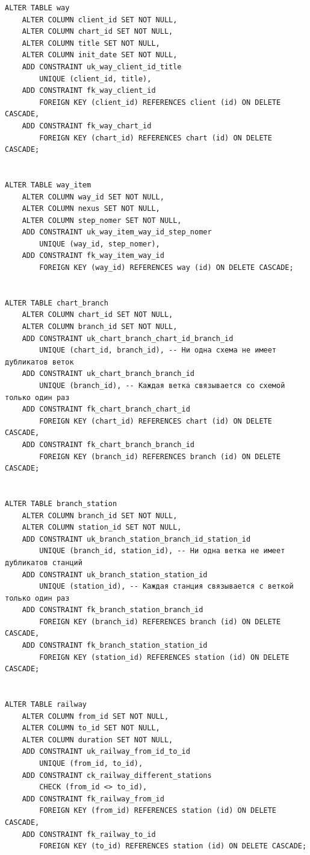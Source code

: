 \clearpage

\begin{lstlisting}[label=lst:cnst2,caption=Запросы для создания ограничений таблиц (часть 2)]
ALTER TABLE way
    ALTER COLUMN client_id SET NOT NULL,
    ALTER COLUMN chart_id SET NOT NULL,
    ALTER COLUMN title SET NOT NULL,
    ALTER COLUMN init_date SET NOT NULL,
    ADD CONSTRAINT uk_way_client_id_title
        UNIQUE (client_id, title),
    ADD CONSTRAINT fk_way_client_id
        FOREIGN KEY (client_id) REFERENCES client (id) ON DELETE CASCADE,
    ADD CONSTRAINT fk_way_chart_id
        FOREIGN KEY (chart_id) REFERENCES chart (id) ON DELETE CASCADE;


ALTER TABLE way_item
    ALTER COLUMN way_id SET NOT NULL,
    ALTER COLUMN nexus SET NOT NULL,
    ALTER COLUMN step_nomer SET NOT NULL,
    ADD CONSTRAINT uk_way_item_way_id_step_nomer
        UNIQUE (way_id, step_nomer),
    ADD CONSTRAINT fk_way_item_way_id
        FOREIGN KEY (way_id) REFERENCES way (id) ON DELETE CASCADE;


ALTER TABLE chart_branch
    ALTER COLUMN chart_id SET NOT NULL,
    ALTER COLUMN branch_id SET NOT NULL,
    ADD CONSTRAINT uk_chart_branch_chart_id_branch_id
        UNIQUE (chart_id, branch_id), -- Ни одна схема не имеет дубликатов веток
    ADD CONSTRAINT uk_chart_branch_branch_id
        UNIQUE (branch_id), -- Каждая ветка связывается со схемой только один раз
    ADD CONSTRAINT fk_chart_branch_chart_id
        FOREIGN KEY (chart_id) REFERENCES chart (id) ON DELETE CASCADE,
    ADD CONSTRAINT fk_chart_branch_branch_id
        FOREIGN KEY (branch_id) REFERENCES branch (id) ON DELETE CASCADE;


ALTER TABLE branch_station
    ALTER COLUMN branch_id SET NOT NULL,
    ALTER COLUMN station_id SET NOT NULL,
    ADD CONSTRAINT uk_branch_station_branch_id_station_id
        UNIQUE (branch_id, station_id), -- Ни одна ветка не имеет дубликатов станций
    ADD CONSTRAINT uk_branch_station_station_id
        UNIQUE (station_id), -- Каждая станция связывается с веткой только один раз
    ADD CONSTRAINT fk_branch_station_branch_id
        FOREIGN KEY (branch_id) REFERENCES branch (id) ON DELETE CASCADE,
    ADD CONSTRAINT fk_branch_station_station_id
        FOREIGN KEY (station_id) REFERENCES station (id) ON DELETE CASCADE;


ALTER TABLE railway
    ALTER COLUMN from_id SET NOT NULL,
    ALTER COLUMN to_id SET NOT NULL,
    ALTER COLUMN duration SET NOT NULL,
    ADD CONSTRAINT uk_railway_from_id_to_id
        UNIQUE (from_id, to_id),
    ADD CONSTRAINT ck_railway_different_stations
        CHECK (from_id <> to_id),
    ADD CONSTRAINT fk_railway_from_id
        FOREIGN KEY (from_id) REFERENCES station (id) ON DELETE CASCADE,
    ADD CONSTRAINT fk_railway_to_id
        FOREIGN KEY (to_id) REFERENCES station (id) ON DELETE CASCADE;
\end{lstlisting}

